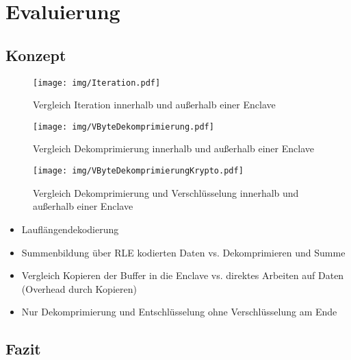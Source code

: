 
\chapter{Evaluierung}

\section{Konzept}

\begin{figure}[h]
	\texttt{[image: img/Iteration.pdf]}
	\centering
	\caption{Vergleich Iteration innerhalb und außerhalb einer Enclave}
	\label{fig:iteration}
\end{figure}

\begin{figure}[h]
	\texttt{[image: img/VByteDekomprimierung.pdf]}
	\centering
	\caption{Vergleich Dekomprimierung innerhalb und außerhalb einer Enclave}
	\label{fig:decompress}
\end{figure}

\begin{figure}[h]
	\texttt{[image: img/VByteDekomprimierungKrypto.pdf]}
	\centering
	\caption{Vergleich Dekomprimierung und Verschlüsselung innerhalb und außerhalb einer Enclave}
	\label{fig:decompresscrypto}
\end{figure}

\begin{itemize}
	\item Lauflängendekodierung
	\item Summenbildung über RLE kodierten Daten vs. Dekomprimieren und Summe
	\item Vergleich Kopieren der Buffer in die Enclave vs. direktes Arbeiten auf Daten (Overhead durch Kopieren)
	\item Nur Dekomprimierung und Entschlüsselung ohne Verschlüsselung am Ende
\end{itemize}


\section{Fazit}
